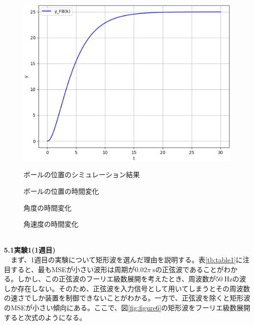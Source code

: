 \documentclass[a4paper,10.5pt]{ltjsarticle}
\begin{document}
\begin{figure}[h]
  \vspace{-30pt}
  \centering
  \begin{minipage}{0.4\linewidth}
    \centering
    \includegraphics[scale=0.35]{figure21.eps}
    \caption{ボールの位置のシミュレーション結果}
    \label{fig:figure36}
  \end{minipage}
  \begin{minipage}[h]{0.4\linewidth}
    \centering
    
    \vspace{-30pt}\caption{ボールの位置の時間変化}
    \label{fig:figure37}
  \end{minipage}
  \begin{minipage}[h]{0.4\linewidth}
    \centering
    
    \vspace{-30pt}\caption{角度の時間変化}
    \label{fig:figure38}
  \end{minipage}
  \begin{minipage}[h]{0.4\linewidth}
    \centering
    
    \vspace{-30pt}\caption{角速度の時間変化}
    \label{fig:figure39}
  \end{minipage}
\end{figure}
\clearpage
\hspace{-2pt}{\Large \bfseries 5.考察}\\
{\large \bfseries 5.1実験1(1週目)}\\
　まず、1週目の実験について矩形波を選んだ理由を説明する。表\ref{tb:table1}に注目すると、最もMSEが小さい波形は周期が$0.02\pi\ \mathrm{s}$の正弦波であることがわかる。しかし、この正弦波のフーリエ級数展開を考えたとき、周波数が$50\ \mathrm{Hz}$の波しか存在しない。そのため、正弦波を入力信号として用いてしまうとその周波数の速さでしか装置を制御できないことがわかる。一方で、正弦波を除くと矩形波のMSEが小さい傾向にある。ここで、図\ref{fig:figure6}の矩形波をフーリエ級数展開すると次式のようになる。
\end{document}
